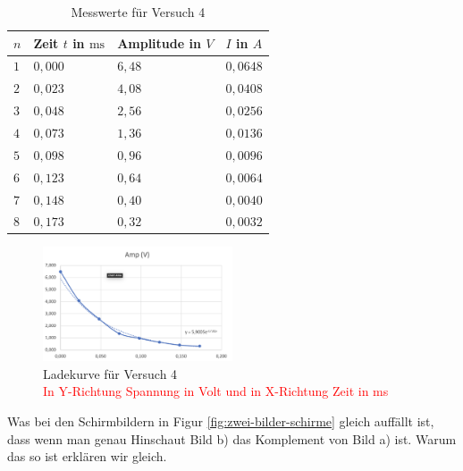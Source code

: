         \begin{table}[H]
            \centering
            \begin{tabular}{|l|l|l|l|}
                \hline
                $n$ & Zeit $t$ in $\mathrm{ms}$ & Amplitude in $V$ & $I$ in $A$\\
                \hline\hline
                $1$ & $0,000$ & $6,48$ & $0,0648$\\
                \hline
                $2$ & $0,023$ & $4,08$ & $0,0408$\\
                \hline
                $3$ & $0,048$ & $2,56$ & $0,0256$\\
                \hline
                $4$ & $0,073$ & $1,36$ & $0,0136$\\
                \hline
                $5$ & $0,098$ & $0,96$ & $0,0096$\\
                \hline
                $6$ & $0,123$ & $0,64$ & $0,0064$\\
                \hline
                $7$ & $0,148$ & $0,40$ & $0,0040$\\
                \hline
                $8$ & $0,173$ & $0,32$ & $0,0032$\\
                \hline
            \end{tabular}
            \caption{Messwerte für Versuch 4}
            \label{tab:versuch4}
        \end{table}

        \begin{figure}[H]
            \centering
            \includegraphics[width=0.5\textwidth]{bilder/Physik_05.png}
            \caption{Ladekurve für Versuch 4\\ \textcolor{red}{In Y-Richtung Spannung in Volt und in X-Richtung Zeit in ms}}
            \label{fig:versuch4}
        \end{figure}

        Was bei den Schirmbildern in Figur \ref{fig:zwei-bilder-schirme} gleich auffällt ist, dass wenn man genau Hinschaut Bild b) das Komplement von Bild a) ist. Warum das so ist erklären wir gleich. 
       
